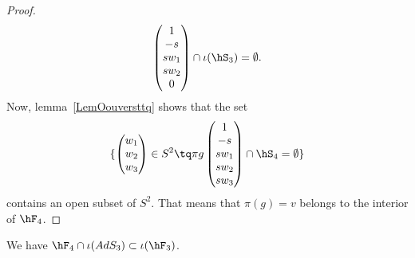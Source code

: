 \begin{proof}
\begin{equation}
\begin{pmatrix}
				1    \\
				-s   \\
				sw_1 \\
				sw_2 \\
				0
			\end{pmatrix}\cap\iota(\hS_3)=\emptyset.
		\end{equation}
		Now, lemma~\ref{LemOouversttq} shows that the set
		\begin{equation}
			\{
			\begin{pmatrix}
				w_1 \\
				w_2 \\
				w_3
			\end{pmatrix}\in S^2\tq
			\pi g\begin{pmatrix}
				1    \\
				-s   \\
				sw_1 \\
				sw_2 \\
				sw_3
			\end{pmatrix}\cap\hS_4=\emptyset
			\}
		\end{equation}
		contains an open subset of $S^2$. That means that $\pi(g)=v$ belongs to the interior of $\hF_4$.
	\end{proof}

	\begin{proposition}		\label{PropFqTroisFt}
		We have $\hF_4\cap\iota(AdS_3)\subset \iota(\hF_3)$.
	\end{proposition}


